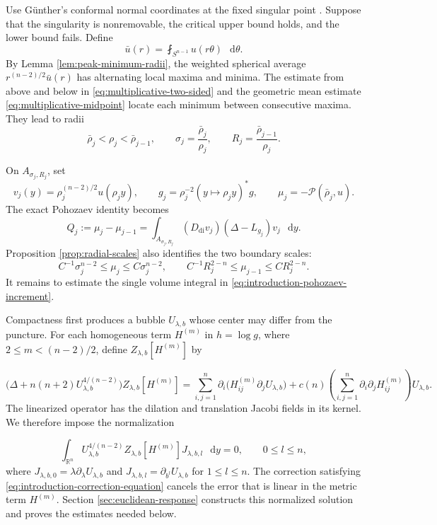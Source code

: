 \documentclass[11pt]{article}
\numberwithin{equation}{section}
\theoremstyle{remark}
\newcommand{\R}{\mathbb R}
\newcommand{\Sph}{S}
\newcommand{\cP}{\mathcal P}
\newcommand{\dd}{\mathop{}\!\mathrm{d}}
\begin{document}
Use Günther's conformal normal coordinates at the fixed singular point \cite[Section  3]{Gunther}. Suppose
that the singularity is nonremovable, the critical upper bound holds,
and the lower bound fails. Define
\[
 \bar u(r)=\fint_{\Sph^{n-1}}u(r\theta)\,\dd\theta.
\]
By Lemma  \ref{lem:peak-minimum-radii}, the weighted spherical average
\(r^{(n-2)/2}\bar u(r)\) has alternating local maxima and minima. The
estimate from above and below in \eqref{eq:multiplicative-two-sided} and the geometric
mean estimate \eqref{eq:multiplicative-midpoint} locate each minimum
between consecutive maxima. They lead to radii
\[
 \bar\rho_j<\rho_j<\bar\rho_{j-1},\qquad
 \sigma_j=\frac{\bar\rho_j}{\rho_j},\qquad
 R_j=\frac{\bar\rho_{j-1}}{\rho_j}.
\]

On \(A_{\sigma_j,R_j}\), set
\[
 v_j(y)=\rho_j^{(n-2)/2}u(\rho_jy),\qquad
 g_j=\rho_j^{-2}(y\mapsto\rho_jy)^*g,
 \qquad \mu_j=-\cP(\bar\rho_j,u).
\]
The exact Pohozaev identity becomes
\begin{equation}\label{eq:introduction-pohozaev-increment}
 Q_j:=\mu_j-\mu_{j-1}
 =\int_{A_{\sigma_j,R_j}}
 (D_{\mathrm{di}}v_j)(\Delta-L_{g_j})v_j\,\dd y.
\end{equation}
Proposition  \ref{prop:radial-scales} also identifies the two boundary
scales:
\[
 C^{-1}\sigma_j^{n-2}\le\mu_j\le C\sigma_j^{n-2},\qquad
 C^{-1}R_j^{2-n}\le\mu_{j-1}\le CR_j^{2-n}.
\]
It remains to estimate the single volume integral in
\eqref{eq:introduction-pohozaev-increment}.

Compactness first produces a bubble \(U_{\lambda,b}\) whose center may
differ from the puncture. For each homogeneous term \(H^{(m)}\) in
\(h=\log g\), where \(2\le m<(n-2)/2\), define
\(Z_{\lambda,b}[H^{(m)}]\) by

\begin{equation}\label{eq:introduction-correction-equation}
 \bigl(\Delta+n(n+2)U_{\lambda,b}^{4/(n-2)}\bigr)
 Z_{\lambda,b}[H^{(m)}]
 =\sum_{i,j=1}^n
 \partial_i\bigl(H_{ij}^{(m)}\partial_jU_{\lambda,b}\bigr)
 +c(n)\left(\sum_{i,j=1}^n
 \partial_i\partial_jH_{ij}^{(m)}\right)U_{\lambda,b}.
\end{equation}
The linearized operator has the dilation and translation Jacobi fields
in its kernel. We therefore impose the normalization

\[
 \int_{\R^n}U_{\lambda,b}^{4/(n-2)}
 Z_{\lambda,b}[H^{(m)}]J_{\lambda,b,l}\,\dd y=0,
 \qquad 0\le l\le n,
\]
where \(J_{\lambda,b,0}=\lambda\partial_\lambda U_{\lambda,b}\) and
\(J_{\lambda,b,l}=\partial_{b^l}U_{\lambda,b}\) for \(1\le l\le n\).
The correction satisfying \eqref{eq:introduction-correction-equation} cancels the error that is linear in the metric term
\(H^{(m)}\). Section  \ref{sec:euclidean-response} constructs this
normalized solution and proves the estimates needed below.
\end{document}
